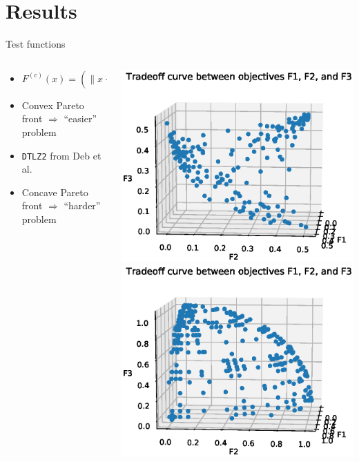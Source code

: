 \documentclass[xcolor=dvipsnames]{beamer}
\begin{document}
\section{Results}
\begin{frame}{Test functions}
\begin{columns}
\begin{column}{.58\textwidth}
\begin{itemize}
\item $F^{(c)}(x) = (\|x - 0.5e^{(1)}\|_2^2, \ldots, \|x - 0.5e^{(p)}\|_2^2)$
\item Convex Pareto front $\Rightarrow$ ``easier'' problem
\end{itemize}
\bigskip\bigskip
\begin{itemize}
\item {\tt DTLZ2} from Deb et al.
\item Concave Pareto front $\Rightarrow$ ``harder'' problem
\end{itemize}
\end{column}
\begin{column}{.4\textwidth}
\bigskip
\includegraphics[width=\textwidth]{f_conv_2.eps}\\
\includegraphics[width=\textwidth]{dtlz2_2.eps}

\end{column}
\end{columns}
\end{frame}
\end{document}
